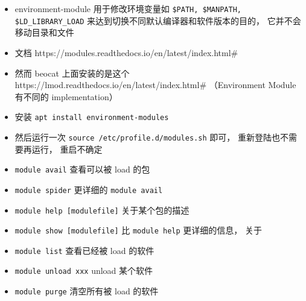 
\begin{issues}
\issueDraft
\end{issues}

\begin{itemize}
\item environment-module 用于修改环境变量如 \verb`$PATH, $MANPATH, $LD_LIBRARY_LOAD` 来达到切换不同默认编译器和软件版本的目的， 它并不会移动目录和文件
\item 文档 https://modules.readthedocs.io/en/latest/index.html#
\item 然而 beocat 上面安装的是这个 https://lmod.readthedocs.io/en/latest/index.html# （Environment Module 有不同的 implementation）
\item 安装 \verb`apt install environment-modules`
\item 然后运行一次 \verb`source /etc/profile.d/modules.sh` 即可， 重新登陆也不需要再运行， 重启不确定
\item \verb`module avail` 查看可以被 load 的包
\item \verb`module spider` 更详细的 \verb`module avail`
\item \verb`module help [modulefile]` 关于某个包的描述
\item \verb`module show [modulefile]` 比 \verb`module help` 更详细的信息， 关于
\item \verb`module list` 查看已经被 load 的软件
\item \verb`module unload xxx` unload 某个软件
\item \verb`module purge` 清空所有被 load 的软件
\end{itemize}
